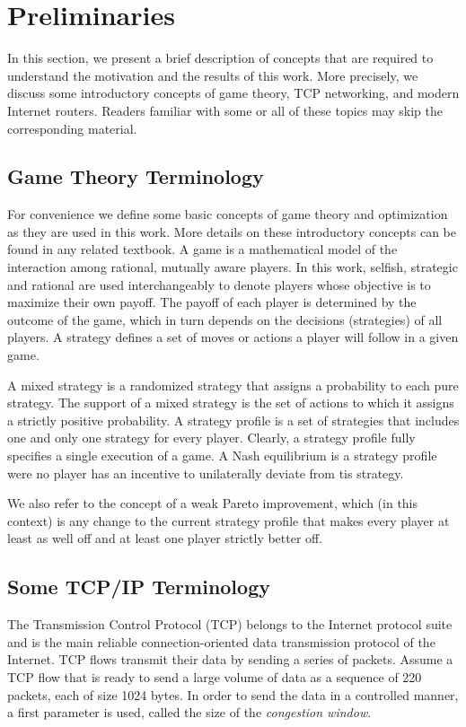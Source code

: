 \documentclass[letterpaper,10pt]{llncs}
\newcommand{\hla}[1]{\hl{#1}}
\renewcommand{\hla}[1]{#1}
\begin{document}
\section{Preliminaries}
\label{sec:prelim}

In this section, we present a brief description of concepts that 
are required to understand the motivation and the results of this work.
More precisely, we discuss some introductory concepts of game theory, 
TCP networking, and modern Internet routers.
Readers familiar with some or all of these topics may skip the 
corresponding material.

\subsection{Game Theory Terminology}

\hla{
For convenience we define some basic concepts of game theory and optimization
as they are used in this work. More details on these introductory concepts can be found
in any related textbook.
A game is a mathematical model of the interaction among rational, mutually aware players.
In this work, selfish, strategic and rational are used interchangeably to denote players
whose objective is to maximize their own payoff.
The payoff of each player is determined by the outcome of the game, which in turn depends
on the decisions (strategies) of all players.
A strategy defines a set of moves or actions a player will follow in a given game.}

\hla{A mixed strategy is a randomized strategy that assigns a probability to each pure
strategy. The support of a mixed strategy is the set of actions to which it assigns a
strictly positive probability. 
A strategy profile is a set of strategies that includes one and only one strategy for every player.
Clearly, a strategy profile fully specifies a single execution of a game.
A Nash equilibrium is a strategy profile were no player has an incentive to unilaterally 
deviate from tis strategy.
}

\hla{
We also refer to the concept of a weak Pareto improvement, which (in this context) is
any change to the current strategy profile that makes every player at least as well off 
and at least one player strictly better off.
}

\subsection{Some TCP/IP Terminology}
\label{sec:tcp}
The Transmission Control Protocol (TCP) belongs to the Internet protocol suite and is the main reliable connection-oriented data transmission
protocol of the Internet. TCP flows transmit their data by sending a series of packets. Assume a TCP flow that is ready to send
a large volume of data as a sequence of 220 packets, each of size 1024 bytes. 
In order to send the data in a controlled manner, a first parameter  is used,  called the size of the \emph{congestion window}.
\end{document}
